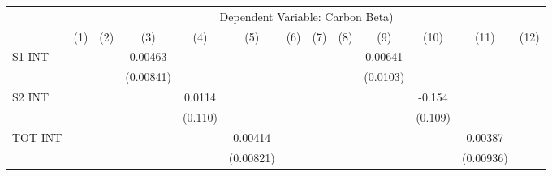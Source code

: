 {
\def\sym#1{\ifmmode^{#1}\else\(^{#1}\)\fi}
\begin{tabular}{l*{12}{c}}
\hline\hline
                    &\multicolumn{12}{c}{Dependent Variable: Carbon Beta) }                                                                                                                                                                                                                 \\\cmidrule(lr){2-13}
                    &\multicolumn{1}{c}{(1)}         &\multicolumn{1}{c}{(2)}         &\multicolumn{1}{c}{(3)}         &\multicolumn{1}{c}{(4)}         &\multicolumn{1}{c}{(5)}         &\multicolumn{1}{c}{(6)}         &\multicolumn{1}{c}{(7)}         &\multicolumn{1}{c}{(8)}         &\multicolumn{1}{c}{(9)}         &\multicolumn{1}{c}{(10)}         &\multicolumn{1}{c}{(11)}         &\multicolumn{1}{c}{(12)}         \\
\hline
S1 INT              &                     &                     &     0.00463         &                     &                     &                     &                     &                     &     0.00641         &                     &                     &                     \\
                    &                     &                     &   (0.00841)         &                     &                     &                     &                     &                     &    (0.0103)         &                     &                     &                     \\
S2 INT              &                     &                     &                     &      0.0114         &                     &                     &                     &                     &                     &      -0.154         &                     &                     \\
                    &                     &                     &                     &     (0.110)         &                     &                     &                     &                     &                     &     (0.109)         &                     &                     \\
TOT INT             &                     &                     &                     &                     &     0.00414         &                     &                     &                     &                     &                     &     0.00387         &                     \\
                    &                     &                     &                     &                     &   (0.00821)         &                     &                     &                     &                     &                     &   (0.00936)         &                     \\

\end{tabular}}
